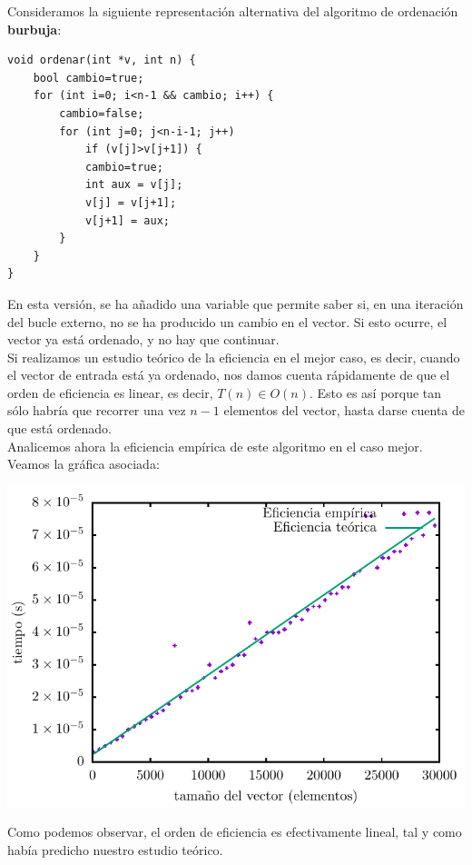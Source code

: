 \documentclass[11pt,a4paper]{article}
\begin{document}
Consideramos la siguiente representación alternativa del algoritmo de ordenación \textbf{burbuja}:

\begin{lstlisting}
void ordenar(int *v, int n) {
    bool cambio=true;
    for (int i=0; i<n-1 && cambio; i++) {
        cambio=false;
        for (int j=0; j<n-i-1; j++)
            if (v[j]>v[j+1]) {
            cambio=true;
            int aux = v[j];
            v[j] = v[j+1];
            v[j+1] = aux;
        }
    }
}
\end{lstlisting}

En esta versión, se ha añadido una variable que permite saber si, en una iteración del bucle externo, no se ha producido un cambio en el vector. Si esto ocurre, el vector ya está ordenado, y no hay que continuar.\\

Si realizamos un estudio teórico de la eficiencia en el mejor caso, es decir, cuando el vector de entrada está ya ordenado, nos damos cuenta rápidamente de que el orden de eficiencia es linear, es decir, $T(n) \in O(n)$. Esto es así porque tan sólo habría que recorrer una vez $n-1$ elementos del vector, hasta darse cuenta de que está ordenado.\\

Analicemos ahora la eficiencia empírica de este algoritmo en el caso mejor. Veamos la gráfica asociada:

\begin{center}
	\includegraphics{img/tiempos_burbuja_optimizado.pdf}
\end{center}

Como podemos observar, el orden de eficiencia es efectivamente lineal, tal y como había predicho nuestro estudio teórico.
\end{document}
